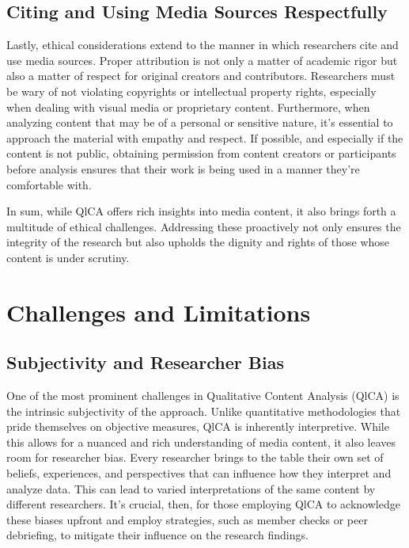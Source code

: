 \documentclass[
  b5paper]{book}
\begin{document}
\hypertarget{citing-and-using-media-sources-respectfully}{%
\subsection*{Citing and Using Media Sources Respectfully}\label{citing-and-using-media-sources-respectfully}}

Lastly, ethical considerations extend to the manner in which researchers cite and use media sources. Proper attribution is not only a matter of academic rigor but also a matter of respect for original creators and contributors. Researchers must be wary of not violating copyrights or intellectual property rights, especially when dealing with visual media or proprietary content. Furthermore, when analyzing content that may be of a personal or sensitive nature, it's essential to approach the material with empathy and respect. If possible, and especially if the content is not public, obtaining permission from content creators or participants before analysis ensures that their work is being used in a manner they're comfortable with.

In sum, while QlCA offers rich insights into media content, it also brings forth a multitude of ethical challenges. Addressing these proactively not only ensures the integrity of the research but also upholds the dignity and rights of those whose content is under scrutiny.

\hypertarget{challenges-and-limitations}{%
\section{Challenges and Limitations}\label{challenges-and-limitations}}

\hypertarget{subjectivity-and-researcher-bias}{%
\subsection*{Subjectivity and Researcher Bias}\label{subjectivity-and-researcher-bias}}

One of the most prominent challenges in Qualitative Content Analysis (QlCA) is the intrinsic subjectivity of the approach. Unlike quantitative methodologies that pride themselves on objective measures, QlCA is inherently interpretive. While this allows for a nuanced and rich understanding of media content, it also leaves room for researcher bias. Every researcher brings to the table their own set of beliefs, experiences, and perspectives that can influence how they interpret and analyze data. This can lead to varied interpretations of the same content by different researchers. It's crucial, then, for those employing QlCA to acknowledge these biases upfront and employ strategies, such as member checks or peer debriefing, to mitigate their influence on the research findings.
\end{document}
